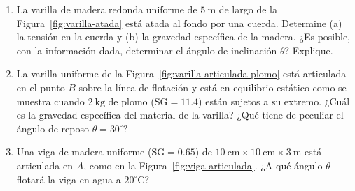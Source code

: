 \begin{enumerate}
\figuraHidrometroProblema

\item La varilla de madera redonda uniforme de $5\ \mathrm{m}$ de largo de la Figura~\ref{fig:varilla-atada} está atada al fondo por una cuerda. Determine (a) la tensión en la cuerda y (b) la gravedad específica de la madera. ¿Es posible, con la información dada, determinar el ángulo de inclinación $\theta$? Explique.

\figuraVarillaAtada

\item La varilla uniforme de la Figura~\ref{fig:varilla-articulada-plomo} está articulada en el punto $B$ sobre la línea de flotación y está en equilibrio estático como se muestra cuando $2\ \mathrm{kg}$ de plomo ($\mathrm{SG} = 11.4$) están sujetos a su extremo. ¿Cuál es la gravedad específica del material de la varilla? ¿Qué tiene de peculiar el ángulo de reposo $\theta = 30^\circ$?

\figuraVarillaArticuladaPlomo

\item Una viga de madera uniforme ($\mathrm{SG} = 0.65$) de $10\ \mathrm{cm} \times 10\ \mathrm{cm} \times 3\ \mathrm{m}$ está articulada en $A$, como en la Figura~\ref{fig:viga-articulada}. ¿A qué ángulo $\theta$ flotará la viga en agua a $20^\circ\mathrm{C}$?

\figuraVigaArticulada
\end{enumerate}